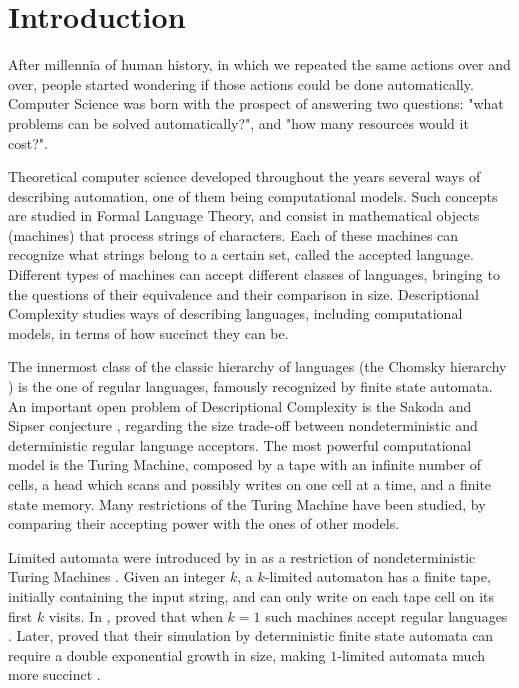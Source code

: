 \chapter{Introduction}
After millennia of human history, in which we repeated the same actions over and over, people started wondering if those actions could be done automatically.
Computer Science was born with the prospect of answering two questions: "what problems can be solved automatically?", and "how many resources would it cost?".

Theoretical computer science developed throughout the years several ways of describing automation, one of them being computational models.
Such concepts are studied in Formal Language Theory, and consist in mathematical objects (machines) that process strings of characters.
Each of these machines can recognize what strings belong to a certain set, called the accepted language.
Different types of machines can accept different classes of languages, bringing to the questions of their equivalence and their comparison in size.
Descriptional Complexity studies ways of describing languages, including computational models, in terms of how succinct they can be.

The innermost class of the classic hierarchy of languages (the Chomsky hierarchy \cite{Cho56}) is the one of regular languages, famously recognized by finite state automata.
An important open problem of Descriptional Complexity is the Sakoda and Sipser conjecture \cite{SakSip78}, regarding the size trade-off between nondeterministic and deterministic regular language acceptors.
The most powerful computational model is the Turing Machine, composed by a tape with an infinite number of cells, a head which scans and possibly writes on one cell at a time, and a finite state memory.
Many restrictions of the Turing Machine have been studied, by comparing their accepting power with the ones of other models.

Limited automata were introduced by \citeauthor{Hib67} in \citeyear{Hib67} as a restriction of nondeterministic Turing Machines \cite{Hib67}.
Given an integer $k$, a $k$-limited automaton has a finite tape, initially containing the input string, and can only write on each tape cell on its first $k$ visits.
In \citeyear{WagWec86}, \citeauthor{WagWec86} proved that when $k=1$ such machines accept regular languages \cite{WagWec86}.
Later, \citeauthor{PigPis14} proved that their simulation by deterministic finite state automata can require a double exponential growth in size, making $1$-limited automata much more succinct \cite{PigPis14}.

